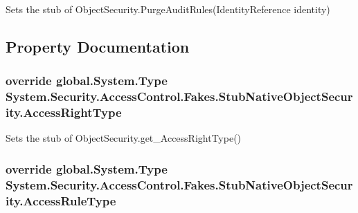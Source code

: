 Sets the stub of Object\-Security.\-Purge\-Audit\-Rules(\-Identity\-Reference identity)



\subsection{Property Documentation}
\hypertarget{class_system_1_1_security_1_1_access_control_1_1_fakes_1_1_stub_native_object_security_a87a154e6ee6d00f56f800070c1683cb7}{
\subsubsection[{Access\-Right\-Type}]{\setlength{\rightskip}{0pt plus 5cm}override global.\-System.\-Type System.\-Security.\-Access\-Control.\-Fakes.\-Stub\-Native\-Object\-Security.\-Access\-Right\-Type\hspace{0.3cm}{\ttfamily [get]}}}\label{class_system_1_1_security_1_1_access_control_1_1_fakes_1_1_stub_native_object_security_a87a154e6ee6d00f56f800070c1683cb7}


Sets the stub of Object\-Security.\-get\-\_\-\-Access\-Right\-Type()

\hypertarget{class_system_1_1_security_1_1_access_control_1_1_fakes_1_1_stub_native_object_security_a6aeec12b8ee4ed08d05cd67947c3f258}{
\subsubsection[{Access\-Rule\-Type}]{\setlength{\rightskip}{0pt plus 5cm}override global.\-System.\-Type System.\-Security.\-Access\-Control.\-Fakes.\-Stub\-Native\-Object\-Security.\-Access\-Rule\-Type\hspace{0.3cm}{\ttfamily [get]}}}\label{class_system_1_1_security_1_1_access_control_1_1_fakes_1_1_stub_native_object_security_a6aeec12b8ee4ed08d05cd67947c3f258}



